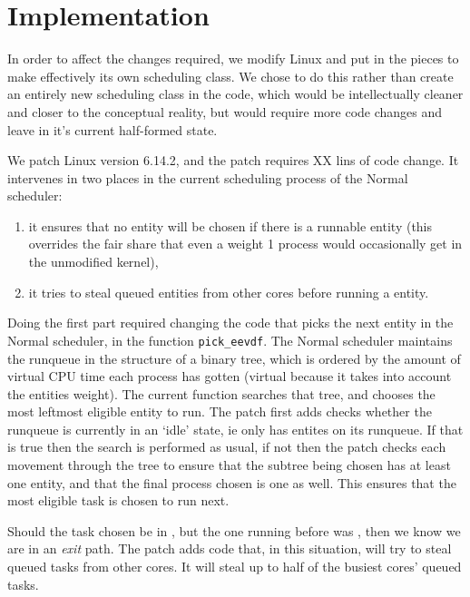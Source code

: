 \section{Implementation}\label{s:implementation}


In order to affect the changes required, we modify Linux and put in the pieces
to make \schedidle{} effectively its own scheduling class. We chose to do this
rather than create an entirely new scheduling class in the code, which would be
intellectually cleaner and closer to the conceptual reality, but would require
more code changes and leave \schedidle{} in it's current half-formed
state.

We patch Linux version 6.14.2, and the patch requires XX lins of code change. It
intervenes in two places in the current scheduling process of the Normal
scheduler: 
\begin{enumerate}
    \item it ensures that no \schedidle{} entity will be chosen if there is a
runnable \schednormal{} entity (this overrides the fair share that even a weight
1 process would occasionally get in the unmodified kernel),
    \item it tries to steal queued \schednormal{} entities from other cores
before running a \schedidle{} entity.

\end{enumerate}


Doing the first part required changing the code that picks the next entity in
the Normal scheduler, in the function \texttt{pick\_eevdf}. The Normal scheduler
maintains the runqueue in the structure of a binary tree, which is ordered by
the amount of virtual CPU time each process has gotten (virtual because it takes
into account the entities weight). The current function searches that tree, and
chooses the most leftmost eligible entity to run. The patch first adds checks
whether the runqueue is currently in an `idle' state, ie only has \schedidle{}
entites on its runqueue. If that is true then the search is performed as usual,
if not then the patch checks each movement through the tree to ensure that the
subtree being chosen has at least one \schednormal{} entity, and that the final
process chosen is one as well. This ensures that the most eligible
\schednormal{} task is chosen to run next.

Should the task chosen be in \schedidle{}, but the one running before was
\schednormal{}, then we know we are in an \textit{exit} path. The patch adds
code that, in this situation, will try to steal queued \schednormal{} tasks from
other cores. It will steal up to half of the busiest cores' queued
\schednormal{} tasks.

